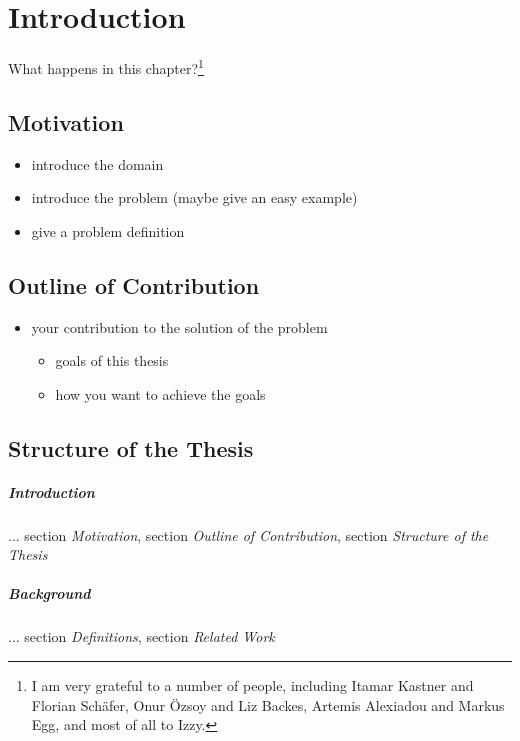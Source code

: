 \chapter{Introduction}\label{introduction}
\setcounter{page}{1}

What happens in this chapter?\footnote{I am very grateful to a number of people, including Itamar Kastner and Florian Schäfer, Onur Özsoy and Liz Backes, Artemis Alexiadou and Markus Egg, and most of all to Izzy.}

\section{Motivation}

\begin{itemize}
\item introduce the domain
\item introduce the problem (maybe give an easy example)
\item give a problem definition
\end{itemize}

\section{Outline of Contribution}

\begin{itemize}
\item your contribution to the solution of the problem
\begin{itemize}
  \item goals of this thesis
  \item how you want to achieve the goals
\end{itemize}
\end{itemize}

\section{Structure of the Thesis}

\paragraph{Introduction} ... section \textit{Motivation}, section \textit{Outline of Contribution}, section \textit{Structure of the Thesis}

\paragraph{Background} ... section \textit{Definitions}, section \textit{Related Work}


